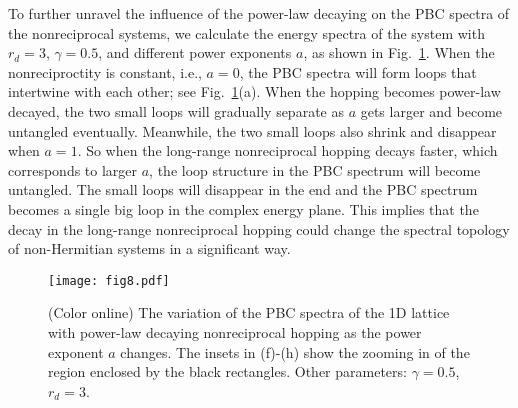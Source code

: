 \documentclass[prb,aps,twocolumn,showpacs]{revtex4-2} %
\begin{document}
To further unravel the influence of the power-law decaying on the PBC spectra of the nonreciprocal systems, we calculate the energy spectra of the system with $r_d=3$, $\gamma=0.5$, and different power exponents $a$, as shown in Fig.~\ref{fig8}. When the nonreciproctity is constant, i.e., $a=0$, the PBC spectra will form loops that intertwine with each other; see Fig.~\ref{fig8}(a). When the hopping becomes power-law decayed, the two small loops will gradually separate as $a$ gets larger and become untangled eventually. Meanwhile, the two small loops also shrink and disappear when $a=1$. So when the long-range nonreciprocal hopping decays faster, which corresponds to larger $a$, the loop structure in the PBC spectrum will become untangled. The small loops will disappear in the end and the PBC spectrum becomes a single big loop in the complex energy plane. This implies that the decay in the long-range nonreciprocal hopping could change the spectral topology of non-Hermitian systems in a significant way.

\begin{figure}[t]
	\texttt{[image: fig8.pdf]}
	\caption{(Color online) The variation of the PBC spectra of the 1D lattice with power-law decaying nonreciprocal hopping as the power exponent $a$ changes. The insets in (f)-(h) show the zooming in of the region enclosed by the black rectangles. Other parameters: $\gamma=0.5$, $r_d=3$.}
	\label{fig8}
\end{figure}
\end{document}
